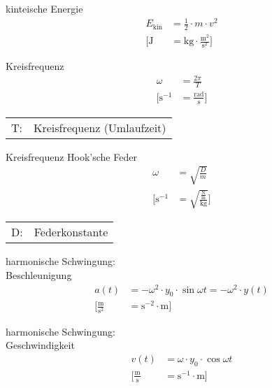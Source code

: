 \begin{karte}{kinteische Energie}
    \begin{align*}
        E_\text{kin} &= \frac{1}{2} \cdot m \cdot v^2 \\
        \bigg[
            \text{J} &= \text{kg} \cdot \frac{\text{m}^2}{\text{s}^2} 
            \bigg]
    \end{align*}
\end{karte}

\begin{karte}{Kreisfrequenz}
    \begin{align*}
        \omega &= \frac{2\pi}{T} \\
        \bigg[ \text{s}^{-1} &= \frac{\text{rad}}{\text{s}} \bigg]
    \end{align*}
    \begin{tabular}[t]{cl}
        T:& Kreisfrequenz (Umlaufzeit)
    \end{tabular}
\end{karte}

\begin{karte}{Kreisfrequenz Hook'sche Feder}
    \begin{align*}
        \omega &= \sqrt{\frac{D}{m}} \\
        \bigg[ \text{s}^{-1} &= \sqrt{\frac{\frac{\text{N}}{\text{m}}}{\text{kg}}} \bigg]
    \end{align*}
    \begin{tabular}[t]{cl}
        D:& Federkonstante 
    \end{tabular}
\end{karte}

\begin{karte}{harmonische Schwingung:\\Beschleunigung}
    \begin{align*}
        a(t) &= - \omega^2 \cdot y_0 \cdot \sin \omega t = - \omega^2 \cdot y(t) \\
        \bigg[ \frac{\text{m}}{\text{s}^2} &= \text{s}^{-2} \cdot \text{m} \bigg]
    \end{align*}
\end{karte}

\begin{karte}{harmonische Schwingung:\\Geschwindigkeit}
    \begin{align*}
        v(t) &= \omega \cdot y_0 \cdot \cos \omega t \\
        \bigg[ \frac{\text{m}}{\text{s}} &= \text{s}^{-1} \cdot \text{m} \bigg]
    \end{align*}
\end{karte}

